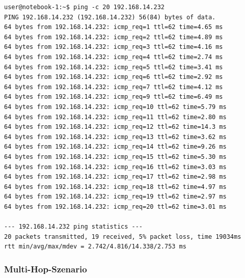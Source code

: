 \documentclass[a4paper,10pt]{article}
\begin{document}
\begin{lstlisting}
user@notebook-1:~$ ping -c 20 192.168.14.232
PING 192.168.14.232 (192.168.14.232) 56(84) bytes of data.
64 bytes from 192.168.14.232: icmp_req=1 ttl=62 time=4.65 ms
64 bytes from 192.168.14.232: icmp_req=2 ttl=62 time=4.89 ms
64 bytes from 192.168.14.232: icmp_req=3 ttl=62 time=4.16 ms
64 bytes from 192.168.14.232: icmp_req=4 ttl=62 time=2.74 ms
64 bytes from 192.168.14.232: icmp_req=5 ttl=62 time=3.41 ms
64 bytes from 192.168.14.232: icmp_req=6 ttl=62 time=2.92 ms
64 bytes from 192.168.14.232: icmp_req=7 ttl=62 time=4.12 ms
64 bytes from 192.168.14.232: icmp_req=9 ttl=62 time=6.49 ms
64 bytes from 192.168.14.232: icmp_req=10 ttl=62 time=5.79 ms
64 bytes from 192.168.14.232: icmp_req=11 ttl=62 time=2.80 ms
64 bytes from 192.168.14.232: icmp_req=12 ttl=62 time=14.3 ms
64 bytes from 192.168.14.232: icmp_req=13 ttl=62 time=3.62 ms
64 bytes from 192.168.14.232: icmp_req=14 ttl=62 time=9.26 ms
64 bytes from 192.168.14.232: icmp_req=15 ttl=62 time=5.30 ms
64 bytes from 192.168.14.232: icmp_req=16 ttl=62 time=3.03 ms
64 bytes from 192.168.14.232: icmp_req=17 ttl=62 time=2.98 ms
64 bytes from 192.168.14.232: icmp_req=18 ttl=62 time=4.97 ms
64 bytes from 192.168.14.232: icmp_req=19 ttl=62 time=2.97 ms
64 bytes from 192.168.14.232: icmp_req=20 ttl=62 time=3.01 ms

--- 192.168.14.232 ping statistics ---
20 packets transmitted, 19 received, 5% packet loss, time 19034ms
rtt min/avg/max/mdev = 2.742/4.816/14.338/2.753 ms
\end{lstlisting}

\subsubsection*{Multi-Hop-Szenario}
\end{document}
